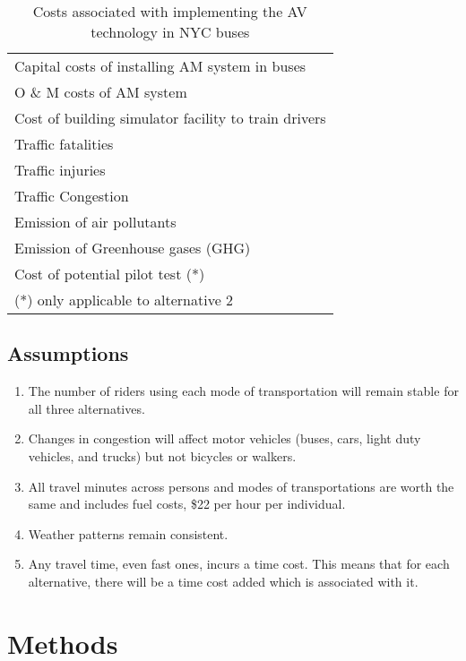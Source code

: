 \documentclass[11pt, letterpaper]{article}
\begin{document}
\begin{table}[h]
\caption{Costs associated with implementing the AV technology in NYC buses}
\begin{center}
\begin{tabular}{l}
\hline\hline
Capital costs of installing AM system in buses\\
O \& M costs of AM system \\
Cost of building simulator facility to train drivers \\
Traffic fatalities \\
Traffic injuries \\
Traffic Congestion \\
Emission of air pollutants \\
Emission of Greenhouse gases (GHG) \\
Cost of potential pilot test (*) \\
\hline\hline
{\footnotesize (*) only applicable to alternative 2}
\end{tabular}
\end{center}
\label{tab:bca.costs}
\end{table}%

\subsection{Assumptions}

\begin{enumerate}
\item The number of riders using each mode of transportation will remain
  stable for all three alternatives.
\item Changes in congestion will affect motor vehicles (buses, cars,
  light duty vehicles, and trucks) but not bicycles or walkers.
\item All travel minutes across persons and modes of transportations
  are worth the same and includes fuel costs, \$22 per hour per individual.
\item Weather patterns remain consistent.
\item Any travel time, even fast ones, incurs a time cost.  This means
  that for each alternative, there will be a time cost added which is
  associated with it.
\end{enumerate}

\section{Methods}
\end{document}
